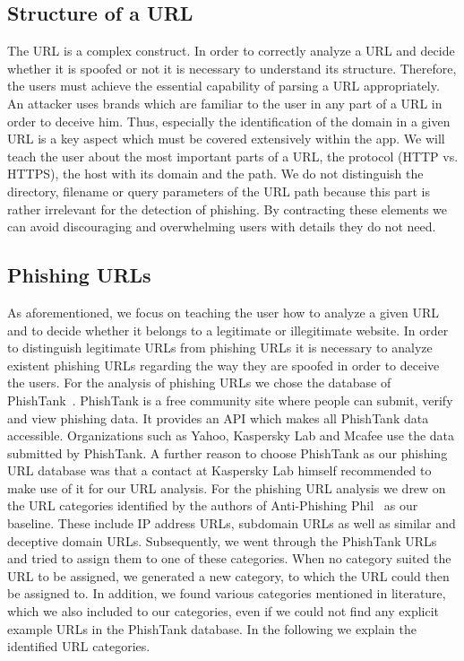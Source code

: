 \subsection{Structure of a URL}
\label{s:url_structure}
The URL is a complex construct. 
In order to correctly analyze a URL and decide whether it is spoofed or not it is necessary to understand its structure. 
Therefore, the users must achieve the essential capability of parsing a URL appropriately.
An attacker uses brands which are familiar to the user in any part of a URL in order to deceive him. 
Thus, especially the identification of the domain in a given URL is a key aspect which must be covered extensively within the app. 
We will teach the user about the most important parts of a URL, the protocol (HTTP vs. HTTPS), the host with its domain and the path.
We do not distinguish the directory, filename or query parameters of the URL path because this part is rather irrelevant for the detection of phishing.
By contracting these elements we can avoid discouraging and overwhelming users with details they do not need.

\subsection{Phishing URLs}
As aforementioned, we focus on teaching the user how to analyze a given URL and to decide whether it belongs to a legitimate or illegitimate website.
 In order to distinguish legitimate URLs from phishing URLs it is necessary to analyze existent phishing URLs regarding the way they are spoofed in order to deceive the users.
 For the analysis of phishing URLs we chose the database of PhishTank~\cite{phishtank}.
PhishTank is a free community site where people can submit, verify and view phishing data.
 It provides an API which makes all PhishTank data accessible.
 Organizations such as Yahoo, Kaspersky Lab and Mcafee use the data submitted by PhishTank. A further reason to choose PhishTank as our phishing URL database was that a contact at Kaspersky Lab himself recommended to make use of it for our URL analysis.
 For the phishing URL analysis we drew on the URL categories identified by the authors of Anti-Phishing Phil~\cite{sheng2007antiphishingphil} as our baseline.
 These include IP address URLs, subdomain URLs as well as similar and deceptive domain URLs.
 Subsequently, we went through the PhishTank URLs and tried to assign them to one of these categories.
 When no category suited the URL to be assigned, we generated a new category, to which the URL could then be assigned to.
 In addition, we found various categories mentioned in literature, which we also included to our categories, even if we could not find any explicit example URLs in the PhishTank database.
 In the following we explain the identified URL categories.
